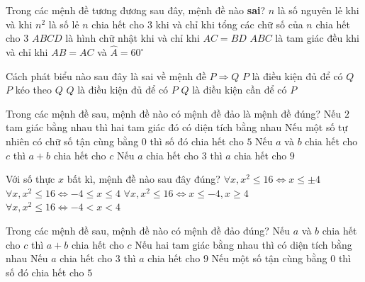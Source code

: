 \begin{ex}%
	Trong các mệnh đề tương đương sau đây, mệnh đề nào \textbf{sai}? 
	\choice 
		{$n $ là số nguyên lẻ khi và khi $n^2$  là số lẻ}
		{$ n$ chia hết cho  $3$ khi và chỉ khi tổng các chữ số của $n$ chia hết cho $3$}
		{\True $ABCD $ là  hình chữ nhật khi và chỉ khi $AC=BD$}
		{$ABC $ là  tam giác đều khi và chỉ khi $AB=AC$ và $\widehat{A}=60^\circ$}
\end{ex}

\begin{ex}%
	 Cách phát biểu nào sau đây là sai về mệnh đề $P\Rightarrow Q$
	\choice 
		{$P$ là điều kiện  đủ để có $Q$}
		{$P$ kéo theo $Q$} 
		{\True $Q$ là điều  kiện đủ để có $P$}
		{$Q$ là điều kiện cần  để có $P$}
\end{ex}

\begin{ex}%
	Trong các mệnh đề sau, mệnh đề nào có mệnh đề  đảo là mệnh đề đúng?
	\choice 
		{Nếu $2$ tam giác bằng nhau thì hai tam giác đó có diện tích bằng  nhau}
		{Nếu một số tự nhiên có chữ số tận cùng bằng $ 0 $ thì số đó chia hết  cho $ 5 $}
		{Nếu $a$ và $b$ chia hết cho $c$ thì $a + b$  chia hết cho $c$}
		{\True Nếu $a$ chia hết cho  $ 3 $ thì $a$ chia hết cho $ 9 $}
\end{ex}

\begin{ex}%
	Với số thực  $x$ bất kì, mệnh đề nào sau đây đúng?
	\choice 
		{$\forall x,x^2\leq 16\Leftrightarrow  x\leq \pm 4 $}
		{\True $\forall x,x^2\leq 16\Leftrightarrow -4\leq x\leq 4  $}
		{$\forall x,x^2\leq  16\Leftrightarrow x\leq -4, x\ge 4$}
		{$ \forall  x,x^2\leq 16\Leftrightarrow -4<x<4$}
\end{ex}

\begin{ex}%
	Trong các mệnh đề sau, mệnh  đề nào có mệnh đề đảo đúng?
	 \choice
		{Nếu $a $ và $b$ chia hết cho $c$ thì $a+b$ chia hết cho $c$} 
		{Nếu hai  tam giác bằng nhau thì có diện tích bằng nhau}
		{\True Nếu $a $ chia  hết cho $3$ thì $a$ chia hết cho $9$}
		{Nếu một số tận  cùng bằng $0$ thì số đó chia hết cho $5$}
\end{ex}

